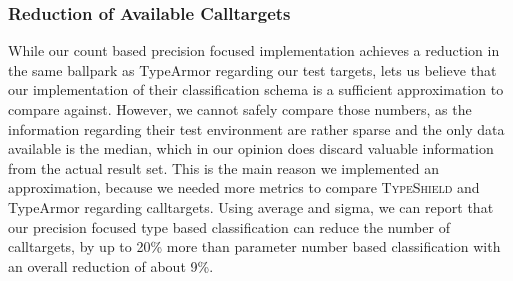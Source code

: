 \subsubsection{Reduction of Available Calltargets}
While our count based precision focused implementation achieves a reduction in the same ballpark as
TypeArmor regarding our test targets, lets us believe that our implementation of their classification
schema is a sufficient approximation to compare against. However, we cannot safely compare those numbers,
as the information regarding their test environment are rather sparse and the only data available is the
median, which in our opinion does discard valuable information from the actual result set. This is the
main reason we implemented an approximation, because we needed more metrics to compare \textsc{TypeShield}
and TypeArmor regarding calltargets. Using average and sigma, we can report that our precision focused
type based classification can reduce the number of calltargets, by up to 20\% more than parameter number
based classification with an overall reduction of about 9\%.


